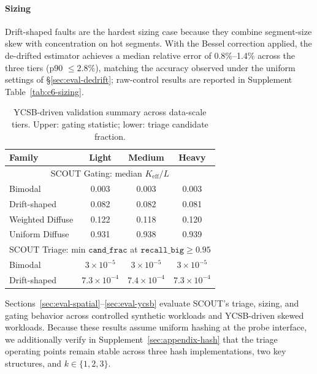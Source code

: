 \paragraph{Sizing}
Drift-shaped faults are the hardest sizing case because they
combine segment-size skew with concentration on hot segments.
With the Bessel correction applied, the de-drifted estimator
achieves a median relative error of 0.8\%--1.4\% across
the three tiers (p90 $\le 2.8\%$), matching the accuracy
observed under the uniform settings of
\S\ref{sec:eval-dedrift}; raw-control results are reported in
Supplement Table~\ref{tab:c6-sizing}.

\begin{table}[!thbp]
\caption{YCSB-driven validation summary across data-scale tiers.
Upper: gating statistic; lower: triage candidate fraction.}
\label{tab:c6-trace-triage}
\centering
\small
\setlength{\tabcolsep}{3pt}
\begin{tabular}{lccc}
\toprule
Family & Light & Medium & Heavy \\
\midrule
\multicolumn{4}{c}{SCOUT Gating: median $K_{\text{eff}}/L$} \\
\midrule
Bimodal          & 0.003 & 0.003 & 0.003 \\
Drift-shaped     & 0.082 & 0.082 & 0.081 \\
Weighted Diffuse & 0.122 & 0.118 & 0.120 \\
Uniform Diffuse  & 0.931 & 0.938 & 0.939 \\
\midrule
\multicolumn{4}{c}{SCOUT Triage: min $\texttt{cand\_frac}$
  at $\texttt{recall\_big}{\ge}0.95$} \\
\midrule
Bimodal      & $3{\times}10^{-5}$ & $3{\times}10^{-5}$ & $3{\times}10^{-5}$ \\
Drift-shaped & $7.3{\times}10^{-4}$ & $7.4{\times}10^{-4}$ & $7.3{\times}10^{-4}$ \\
\bottomrule
\end{tabular}
\end{table}

Sections~\ref{sec:eval-spatial}--\ref{sec:eval-ycsb} evaluate SCOUT's triage, sizing, and gating behavior across controlled synthetic workloads and YCSB-driven skewed workloads. Because
these results assume uniform hashing at the probe interface, we additionally verify in Supplement~\ref{sec:appendix-hash} that the triage operating points remain stable across three hash
implementations, two key structures, and $k\in\{1,2,3\}$.
\label{sec:eval-summary}
